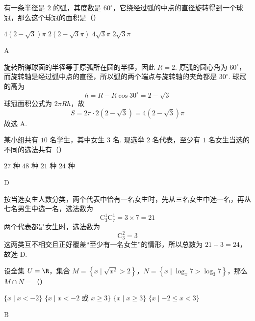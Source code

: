 \begin{problem}
有一条半径是 \(2\) 的弧，其度数是 \(60^\circ\)，它绕经过弧的中点的直径旋转得到一个球冠，那么这个球冠的面积是（\quad）

\choices
    {\(4(2-\sqrt{3})\pi\)}
    {\(2(2-\sqrt{3}\pi)\)}
    {\(4\sqrt{3}\pi\)}
    {\(2\sqrt{3}\pi\)}
\end{problem}

\begin{answer}
A
\end{answer}

\begin{solution}
旋转所得球面的半径等于原弧所在圆的半径，因此 \(R=2\). 原弧的圆心角为 \(60^\circ\)，而旋转轴是经过弧中点的直径，所以弧的两个端点与旋转轴的夹角都是 \(30^\circ\). 球冠的高为
\[
h=R-R\cos30^\circ=2-\sqrt{3}
\]
球冠面积公式为 \(2\pi Rh\)，故
\[
S=2\pi\cdot2(2-\sqrt3)=4(2-\sqrt3)\pi
\]
故选 A.
\end{solution}

\begin{problem}
某小组共有 \(10\) 名学生，其中女生 \(3\) 名. 现选举 \(2\) 名代表，至少有 \(1\) 名女生当选的不同的选法共有（\quad）

\choices
    {\(27\) 种}
    {\(48\) 种}
    {\(21\) 种}
    {\(24\) 种}
\end{problem}

\begin{answer}
D
\end{answer}

\begin{solution}
按当选女生人数分类，两个代表中恰有一名女生时，先从三名女生中选一名，再从七名男生中选一名，选法数为
\[
\mathrm C_3^1\mathrm C_7^1=3\times7=21
\]
两个代表都是女生时，选法数为
\[
\mathrm C_3^2=3
\]
这两类互不相交且正好覆盖“至少有一名女生”的情形，所以总数为 \(21+3=24\)，故选 D.
\end{solution}

\begin{problem}
设全集 \(U=\R\)，集合 \(M=\left\{x\mid \sqrt{x^2}>2\right\}\)，\(N=\left\{x\mid \log_x 7>\log_3 7\right\}\)，那么 \(M\cap\overline{N}=\)（\quad）

\choices
    {\(\{x\mid x<-2\}\)}
    {\(\{x\mid x<-2\text{\ 或\ }x\geqslant 3\}\)}
    {\(\{x\mid x\geqslant 3\}\)}
    {\(\{x\mid -2\leqslant x<3\}\)}
\end{problem}

\begin{answer}
B
\end{answer}

